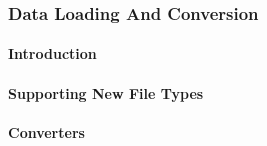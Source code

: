 \subsubsection{Data Loading And Conversion}

\paragraph{Introduction}
\paragraph{Supporting New File Types}
\paragraph{Converters}
